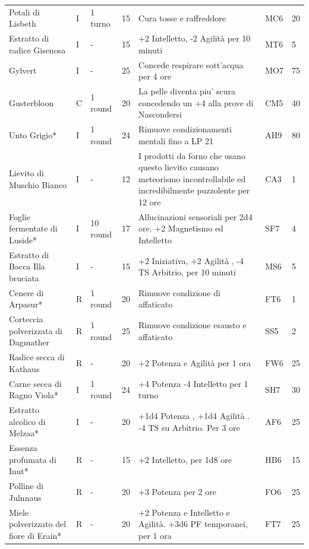 \documentclass[a4paper,11pt,twoside,openany]{book}
\begin{document}
{\begin{longtable}{|L{3.2cm} |k{0.7cm} |k{1.7cm}| D{1cm} |L{5cm} |k{1.5cm} |k{1cm}|}
Petali di Lisbeth  & I & 1 turno & 15 & Cura tosse e raffreddore & MC6 & 20\\
Estratto di radice Gisenosa & I & - & 15 & +2 Intelletto, -2 Agilità per 10 minuti & MT6 & 5\\
Gylvert& I & - & 25 & Concede respirare sott'acqua per 4 ore & MO7 & 75\\
Gusterbloon  & C & 1 round & 20 & La pelle diventa piu' scura concedendo un +4 alla prove di Nascondersi & CM5 & 40\\
Unto Grigio{*}  & I & 1 round & 24 & Rimuove condizionamenti mentali fino a LP 21 & AH9 & 80\\
Lievito di Muschio Bianco & I & - & 12 & I prodotti da forno che usano questo lievito causano meteorismo incontrollabile ed incredibilmente puzzolente per 12 ore & CA3 & 1\\
Foglie fermentate di Luside*& I & 10 round & 17 & Allucinazioni sensoriali per 2d4 ore. +2 Magnetismo ed Intelletto & SF7 & 4\\
Estratto di Bacca Illa bruciata& I & - & 15 & +2 Iniziativa, +2 Agilità , -4 TS Arbitrio, per 10 minuti& MS6 & 5\\
Cenere di Arpasur{*}  & R & 1 round & 20 & Rimuove condizione di affaticato & FT6 & 1\\
Corteccia polverizzata di Dagmather& R & 1 round & 25 & Rimuove condizione esausto e affaticato & SS5 & 2\\
Radice secca di Kathaus & R & - & 20 & +2 Potenza e Agilità per 1 ora & FW6 & 25\\
Carne secca di Ragno Viola*  & I & 1 round & 24 & +4 Potenza -4 Intelletto per 1 turno & SH7 & 30\\
Estratto alcolico di Melzaa*& I & - & 20 & +1d4 Potenza , +1d4 Agilità . -4 TS su Arbitrio. Per 3 ore& AF6 & 25\\
Essenza profumata di Inut* & R & - & 15 & +2 Intelletto, per 1d8 ore & HB6 & 15\\
Polline di Julnnaus & R & - & 20 & +3 Potenza per 2 ore & FO6 & 25\\
Miele polverizzato del fiore di Erain* & R & - & 20 & +2 Potenza e Intelletto e Agilità. +3d6 PF temporanei, per 1 ora& FT7 & 25 \\
\end{longtable}

}
\end{document}
